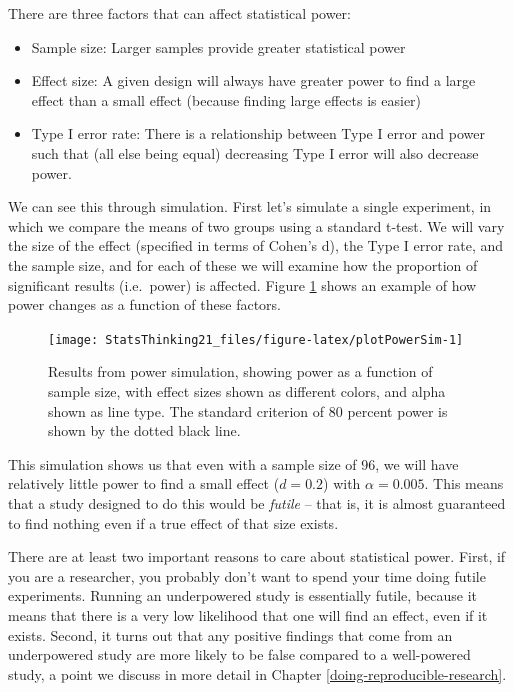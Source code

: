 \documentclass[12pt,]{book}
\providecommand{\tightlist}{%
  \setlength{\itemsep}{0pt}\setlength{\parskip}{0pt}}
\theoremstyle{definition}
\theoremstyle{definition}
\theoremstyle{definition}
\theoremstyle{remark}
\begin{document}
There are three factors that can affect statistical power:

\begin{itemize}
\tightlist
\item
  Sample size: Larger samples provide greater statistical power
\item
  Effect size: A given design will always have greater power to find a large effect than a small effect (because finding large effects is easier)
\item
  Type I error rate: There is a relationship between Type I error and power such that (all else being equal) decreasing Type I error will also decrease power.
\end{itemize}

We can see this through simulation. First let's simulate a single experiment, in which we compare the means of two groups using a standard t-test. We will vary the size of the effect (specified in terms of Cohen's d), the Type I error rate, and the sample size, and for each of these we will examine how the proportion of significant results (i.e.~power) is affected. Figure \ref{fig:plotPowerSim} shows an example of how power changes as a function of these factors.

\begin{figure}
\texttt{[image: StatsThinking21\_files/figure-latex/plotPowerSim-1]} \caption{Results from power simulation, showing power as a function of sample size, with effect sizes shown as different colors, and alpha shown as line type. The standard criterion of 80 percent power is shown by the dotted black line.}\label{fig:plotPowerSim}
\end{figure}

This simulation shows us that even with a sample size of 96, we will have relatively little power to find a small effect (\(d = 0.2\)) with \(\alpha = 0.005\). This means that a study designed to do this would be \emph{futile} -- that is, it is almost guaranteed to find nothing even if a true effect of that size exists.

There are at least two important reasons to care about statistical power. First, if you are a researcher, you probably don't want to spend your time doing futile experiments. Running an underpowered study is essentially futile, because it means that there is a very low likelihood that one will find an effect, even if it exists. Second, it turns out that any positive findings that come from an underpowered study are more likely to be false compared to a well-powered study, a point we discuss in more detail in Chapter \ref{doing-reproducible-research}.
\end{document}
